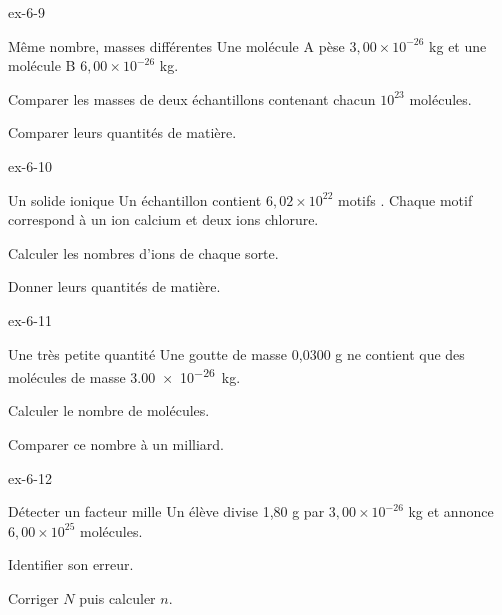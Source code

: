 \begin{blocLivre}{ex-6-9}\begin{exercice}[3]{Même nombre, masses différentes}
Une molécule A pèse $3,00\times10^{-26}$ kg et une molécule B $6,00\times10^{-26}$ kg.
\begin{questions}
\item Comparer les masses de deux échantillons contenant chacun $10^{23}$ molécules.
\item Comparer leurs quantités de matière.
\end{questions}
\end{exercice}\end{blocLivre}
\begin{blocLivre}{ex-6-10}\begin{exercice}[3]{Un solide ionique}
Un échantillon contient $6,02\times10^{22}$ motifs . Chaque motif correspond à un ion calcium et deux ions chlorure.
\begin{questions}
\item Calculer les nombres d’ions de chaque sorte.
\item Donner leurs quantités de matière.
\end{questions}
\end{exercice}\end{blocLivre}
\begin{blocLivre}{ex-6-11}\begin{exercice}[3]{Une très petite quantité}
Une goutte de masse 0,0300 g ne contient que des molécules de masse \qty{3,00e-26}{kg}.
\begin{questions}
\item Calculer le nombre de molécules.
\item Comparer ce nombre à un milliard.
\end{questions}
\end{exercice}\end{blocLivre}
\begin{blocLivre}{ex-6-12}\begin{exercice}[3]{Détecter un facteur mille}
Un élève divise 1,80 g par $3,00\times10^{-26}$ kg et annonce $6,00\times10^{25}$ molécules.
\begin{questions}
\item Identifier son erreur.
\item Corriger $N$ puis calculer $n$.
\end{questions}
\end{exercice}\end{blocLivre}

